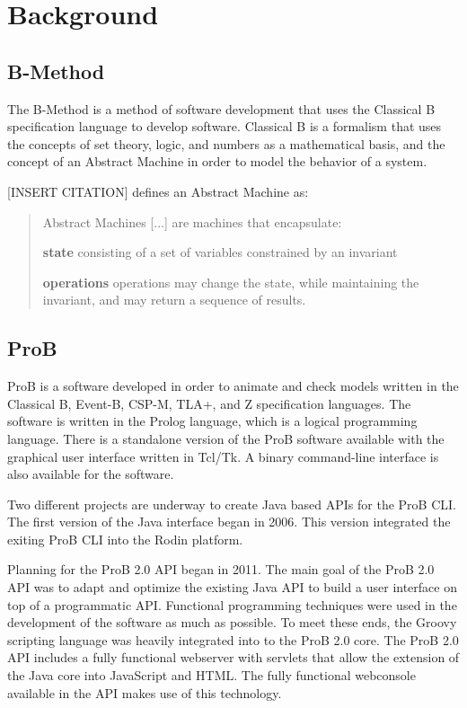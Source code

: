 \section{Background}

\subsection{B-Method}

The B-Method is a method of software development that uses the Classical B specification language to develop software. Classical B is a formalism that uses the concepts of set theory, logic, and numbers as a mathematical basis, and the concept of an Abstract Machine in order to model the behavior of a system. 


[INSERT CITATION] defines an Abstract Machine as:

\begin{quotation}

Abstract Machines [...] are machines that encapsulate:

\textbf{state} consisting of a set of variables constrained by an invariant

\textbf{operations} operations may change the state, while maintaining the invariant, and may return a sequence of results.

\end{quotation}



\subsection{ProB}

ProB is a software developed in order to animate and check models written in the Classical B, Event-B, CSP-M, TLA+, and Z specification languages. The software is written in the Prolog language, which is a logical programming language. There is a standalone version of the ProB software available with the graphical user interface written in Tcl/Tk. A binary command-line interface is also available for the software. 

Two different projects are underway to create Java based APIs for the ProB CLI. The first version of the Java interface began in 2006. This version integrated the exiting ProB CLI into the Rodin platform.

Planning for the ProB 2.0 API began in 2011. The main goal of the ProB 2.0 API was to adapt and optimize the existing Java API to build a user interface on top of a programmatic API. Functional programming techniques were used in the development of the software as much as possible. To meet these ends, the Groovy scripting language was heavily integrated into to the ProB 2.0 core. The ProB 2.0 API includes a fully functional webserver with servlets that allow the extension of the Java core into JavaScript and HTML. The fully functional webconsole available in the API makes use of this technology.

